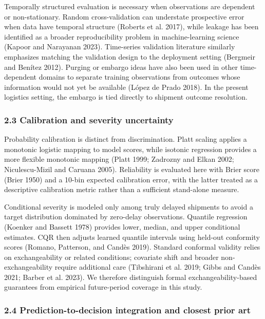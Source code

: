 \documentclass[
]{article}
\begin{document}
Temporally structured evaluation is necessary when observations are
dependent or non-stationary. Random cross-validation can understate
prospective error when data have temporal structure (Roberts et al.
2017), while leakage has been identified as a broader reproducibility
problem in machine-learning science (Kapoor and Narayanan 2023).
Time-series validation literature similarly emphasizes matching the
validation design to the deployment setting (Bergmeir and Benítez 2012).
Purging or embargo ideas have also been used in other time-dependent
domains to separate training observations from outcomes whose
information would not yet be available (López de Prado 2018). In the
present logistics setting, the embargo is tied directly to shipment
outcome resolution.

\subsubsection{2.3 Calibration and severity
uncertainty}\label{calibration-and-severity-uncertainty}

Probability calibration is distinct from discrimination. Platt scaling
applies a monotonic logistic mapping to model scores, while isotonic
regression provides a more flexible monotonic mapping (Platt 1999;
Zadrozny and Elkan 2002; Niculescu-Mizil and Caruana 2005). Reliability
is evaluated here with Brier score (Brier 1950) and a 10-bin expected
calibration error, with the latter treated as a descriptive calibration
metric rather than a sufficient stand-alone measure.

Conditional severity is modeled only among truly delayed shipments to
avoid a target distribution dominated by zero-delay observations.
Quantile regression (Koenker and Bassett 1978) provides lower, median,
and upper conditional estimates. CQR then adjusts learned quantile
intervals using held-out conformity scores (Romano, Patterson, and
Candès 2019). Standard conformal validity relies on exchangeability or
related conditions; covariate shift and broader non-exchangeability
require additional care (Tibshirani et al. 2019; Gibbs and Candès 2021;
Barber et al. 2023). We therefore distinguish formal
exchangeability-based guarantees from empirical future-period coverage
in this study.

\subsubsection{2.4 Prediction-to-decision integration and closest prior
art}\label{prediction-to-decision-integration-and-closest-prior-art}
\end{document}
